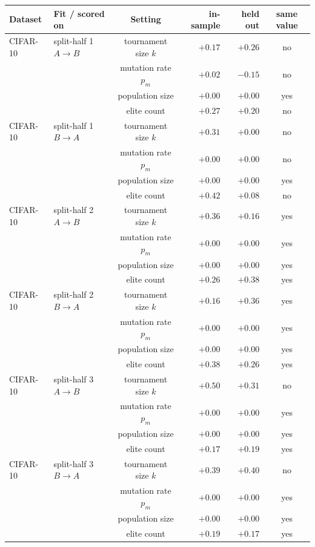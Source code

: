 \begin{tabular}{l l c rr c}
\toprule
\textbf{Dataset} & \textbf{Fit / scored on} & \textbf{Setting} & \textbf{in-sample} & \textbf{held out} & \textbf{same value} \\
\midrule
CIFAR-10 & split-half 1 $A\!\to\!B$ & tournament size $k$ & $+0.17$ & $+0.26$ & no \\
 &  & mutation rate $p_m$ & $+0.02$ & $-0.15$ & no \\
 &  & population size & $+0.00$ & $+0.00$ & yes \\
 &  & elite count & $+0.27$ & $+0.20$ & no \\
CIFAR-10 & split-half 1 $B\!\to\!A$ & tournament size $k$ & $+0.31$ & $+0.00$ & no \\
 &  & mutation rate $p_m$ & $+0.00$ & $+0.00$ & no \\
 &  & population size & $+0.00$ & $+0.00$ & yes \\
 &  & elite count & $+0.42$ & $+0.08$ & no \\
\addlinespace
CIFAR-10 & split-half 2 $A\!\to\!B$ & tournament size $k$ & $+0.36$ & $+0.16$ & yes \\
 &  & mutation rate $p_m$ & $+0.00$ & $+0.00$ & yes \\
 &  & population size & $+0.00$ & $+0.00$ & yes \\
 &  & elite count & $+0.26$ & $+0.38$ & yes \\
CIFAR-10 & split-half 2 $B\!\to\!A$ & tournament size $k$ & $+0.16$ & $+0.36$ & yes \\
 &  & mutation rate $p_m$ & $+0.00$ & $+0.00$ & yes \\
 &  & population size & $+0.00$ & $+0.00$ & yes \\
 &  & elite count & $+0.38$ & $+0.26$ & yes \\
\addlinespace
CIFAR-10 & split-half 3 $A\!\to\!B$ & tournament size $k$ & $+0.50$ & $+0.31$ & no \\
 &  & mutation rate $p_m$ & $+0.00$ & $+0.00$ & yes \\
 &  & population size & $+0.00$ & $+0.00$ & yes \\
 &  & elite count & $+0.17$ & $+0.19$ & yes \\
CIFAR-10 & split-half 3 $B\!\to\!A$ & tournament size $k$ & $+0.39$ & $+0.40$ & no \\
 &  & mutation rate $p_m$ & $+0.00$ & $+0.00$ & yes \\
 &  & population size & $+0.00$ & $+0.00$ & yes \\
 &  & elite count & $+0.19$ & $+0.17$ & yes \\

\end{tabular}
